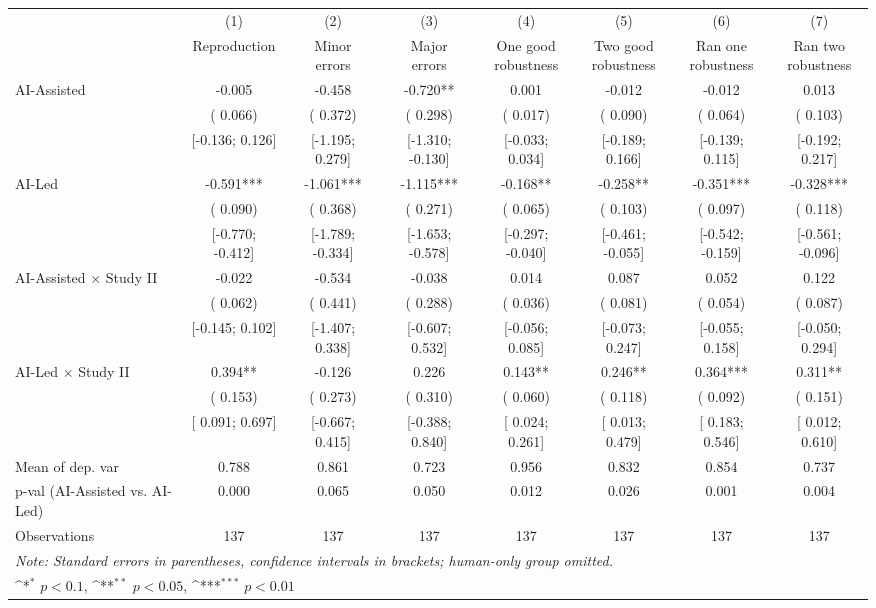 \def\sym#1{\ifmmode^{#1}\else\(^{#1}\)\fi}
\begin{tabular}{l*{7}{c}}
\hline\hline
& (1) & (2) & (3) & (4) & (5) & (6) & (7)\\
                    &
Reproduction   &\shortstack[c]{Minor\\errors}   &\shortstack[c]{Major\\errors}   &\shortstack[c]{One good\\robustness}   &\shortstack[c]{Two good\\robustness}   &\shortstack[c]{Ran one\\robustness}   &\shortstack[c]{Ran two\\robustness}
   \\
\hline
AI-Assisted & -0.005 & -0.458 & -0.720** &  0.001 & -0.012 & -0.012 &  0.013 \\
 & ( 0.066) & ( 0.372) & ( 0.298) & ( 0.017) & ( 0.090) & ( 0.064) & ( 0.103) \\
 & [-0.136;  0.126] & [-1.195;  0.279] & [-1.310; -0.130] & [-0.033;  0.034] & [-0.189;  0.166] & [-0.139;  0.115] & [-0.192;  0.217] \\
AI-Led & -0.591*** & -1.061*** & -1.115*** & -0.168** & -0.258** & -0.351*** & -0.328*** \\
 & ( 0.090) & ( 0.368) & ( 0.271) & ( 0.065) & ( 0.103) & ( 0.097) & ( 0.118) \\
 & [-0.770; -0.412] & [-1.789; -0.334] & [-1.653; -0.578] & [-0.297; -0.040] & [-0.461; -0.055] & [-0.542; -0.159] & [-0.561; -0.096] \\
AI-Assisted $\times$ Study II & -0.022 & -0.534 & -0.038 &  0.014 &  0.087 &  0.052 &  0.122 \\
 & ( 0.062) & ( 0.441) & ( 0.288) & ( 0.036) & ( 0.081) & ( 0.054) & ( 0.087) \\
 & [-0.145;  0.102] & [-1.407;  0.338] & [-0.607;  0.532] & [-0.056;  0.085] & [-0.073;  0.247] & [-0.055;  0.158] & [-0.050;  0.294] \\
AI-Led $\times$ Study II &  0.394** & -0.126 &  0.226 &  0.143** &  0.246** &  0.364*** &  0.311** \\
 & ( 0.153) & ( 0.273) & ( 0.310) & ( 0.060) & ( 0.118) & ( 0.092) & ( 0.151) \\
 & [ 0.091;  0.697] & [-0.667;  0.415] & [-0.388;  0.840] & [ 0.024;  0.261] & [ 0.013;  0.479] & [ 0.183;  0.546] & [ 0.012;  0.610] \\
\hline
Mean of dep. var &  0.788 &  0.861 &  0.723 &  0.956 &  0.832 &  0.854 &  0.737 \\
p-val (AI-Assisted vs. AI-Led) &  0.000 &  0.065 &  0.050 &  0.012 &  0.026 &  0.001 &  0.004 \\
Observations & 137 & 137 & 137 & 137 & 137 & 137 & 137 \\
\hline\hline
\multicolumn{8}{l}{\it{Note:} Standard errors in parentheses, confidence intervals in brackets; human-only group omitted.}\\
\multicolumn{8}{l}{\sym{*} \(p<0.1\), \sym{**} \(p<0.05\), \sym{***} \(p<0.01\)}\\
\end{tabular}
